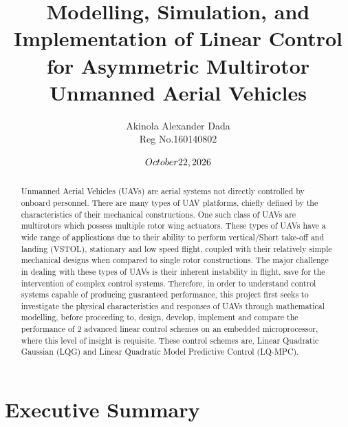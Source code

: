 \documentclass[12pt,a4paper,twoside]{report}
\title{ Modelling, Simulation, and Implementation of Linear Control for Asymmetric Multirotor Unmanned Aerial Vehicles}
\author{Akinola Alexander Dada \\ Reg No.160140802}
\date{$\today$}
\begin{document}
	
	\maketitle
	
	\newpage
	
	\begin{abstract}
		Unmanned Aerial Vehicles (UAVs) are aerial systems not directly controlled by onboard personnel. There are many types of UAV platforms, chiefly defined by the characteristics of their mechanical constructions. One such class of UAVs are multirotors which possess multiple rotor wing actuators. These types of UAVs have a wide range of applications due to their ability to perform vertical/Short take-off and landing (VSTOL), stationary and low speed flight, coupled with their relatively simple mechanical designs when compared to single rotor constructions. The major challenge in dealing with these types of UAVs is their inherent instability in flight, save for the intervention of complex control systems. Therefore, in order to understand control systems capable of producing guaranteed performance, this project first seeks to investigate the physical characteristics and responses of UAVs through mathematical modelling, before proceeding to, design, develop, implement and compare the performance of 2 advanced linear control schemes on an embedded microprocessor, where this level of insight is requisite. These control schemes are, Linear Quadratic Gaussian (LQG) and Linear Quadratic Model Predictive Control (LQ-MPC). 
	\end{abstract}
	\newpage
	
	\section*{Executive Summary}
	
\end{document}
